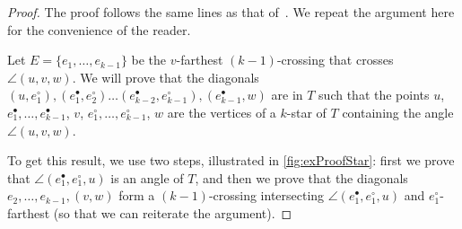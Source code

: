 \documentclass{amsart}
\theoremstyle{remark}
\begin{document}
\begin{proof}
The proof follows the same lines as that of~\cite[Thm.~4.1]{PilaudSantos-multitriangulations}. We repeat the argument here for the convenience of the reader.

Let $E=\{e_1, \dots , e_{k-1}\}$ be the $v$-farthest $(k-1)$-crossing that crosses $\angle(u, v, w)$.
We will prove that the diagonals $(u, e^\circ_1), (e^\bullet_1, e^\circ_2) \dots (e^\bullet_{k-2}, e^\circ_{k-1}), (e^\bullet_{k-1}, w)$ are in $T$ such that the points $u$, $e^\bullet_1, \dots, e^\bullet_{k-1}$, $v$, $e^\circ_1, \dots, e^\circ_{k-1}$, $w$ are the vertices of a $k$-star of $T$ containing the angle $\angle(u, v, w)$. 

To get this result, we use two steps, illustrated in \cref{fig:exProofStar}: first we prove that $\angle(e^\bullet_1, e^\circ_1, u)$ is an angle of $T$, and then we prove that the diagonals $e_2, \dots, e_{k-1}, (v, w)$ form a $(k-1)$-crossing intersecting $\angle(e^\bullet_1, e^\circ_1, u)$ and $e^\circ_1$-farthest (so that we can reiterate the argument).



\end{proof}
\end{document}
